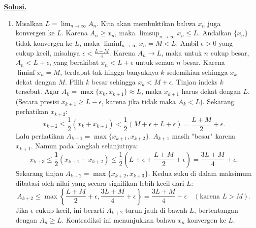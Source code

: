 \documentclass[12pt,twoside]{article}
\newenvironment{solution}
{
	\par\noindent\textbf{\underline{Solusi.}}\\
}
{
	\par
}
\begin{document}
\begin{enumerate}
\begin{solution}
\begin{enumerate}
            \item Misalkan $L = \lim_{n\to\infty} A_n$. Kita akan membuktikan bahwa $x_n$ juga konvergen ke $L$.
                  Karena $A_n \ge x_n$, maka $\limsup_{n\to\infty} x_n \le L$.
                  Andaikan $\{x_n\}$ tidak konvergen ke $L$, maka $\liminf_{n\to\infty} x_n = M < L$.
                  Ambil $\epsilon > 0$ yang cukup kecil, misalnya $\epsilon < \frac{L-M}{4}$.
                  Karena $A_n \to L$, maka untuk $n$ cukup besar, $A_n < L+\epsilon$, yang berakibat $x_n < L+\epsilon$ untuk semua $n$ besar.
                  Karena $\liminf x_n = M$, terdapat tak hingga banyaknya $k$ sedemikian sehingga $x_k$ dekat dengan $M$. Pilih $k$ besar sehingga $x_k < M + \epsilon$.
                  Tinjau indeks $k$ tersebut. Agar $A_k = \max\{x_k, x_{k+1}\} \approx L$, maka $x_{k+1}$ harus dekat dengan $L$. (Secara presisi $x_{k+1} \ge L-\epsilon$, karena jika tidak maka $A_k < L$).
                  Sekarang perhatikan $x_{k+2}$:
                  \[ x_{k+2} \le \frac{1}{2}(x_k + x_{k+1}) < \frac{1}{2}(M+\epsilon + L+\epsilon) = \frac{L+M}{2} + \epsilon. \]
                  Lalu perhatikan $A_{k+1} = \max\{x_{k+1}, x_{k+2}\}$.
                  $A_{k+1}$ masih "besar" karena $x_{k+1}$.
                  Namun pada langkah selanjutnya:
                  \[ x_{k+3} \le \frac{1}{2}(x_{k+1} + x_{k+2}) \le \frac{1}{2}\left(L+\epsilon + \frac{L+M}{2} + \epsilon\right) = \frac{3L+M}{4} + \epsilon. \]
                  Sekarang tinjau $A_{k+2} = \max\{x_{k+2}, x_{k+3}\}$.
                  Kedua suku di dalam maksimum dibatasi oleh nilai yang secara signifikan lebih kecil dari $L$:
                  \[ A_{k+2} \le \max\left\{ \frac{L+M}{2}+\epsilon, \frac{3L+M}{4}+\epsilon \right\} = \frac{3L+M}{4} + \epsilon \quad (\text{karena } L > M). \]
                  Jika $\epsilon$ cukup kecil, ini berarti $A_{k+2}$ turun jauh di bawah $L$, bertentangan dengan $A_n \ge L$.
                  Kontradiksi ini menunjukkan bahwa $x_n$ konvergen ke $L$.
          \end{enumerate}
        \end{solution}



\end{enumerate}
\end{document}
